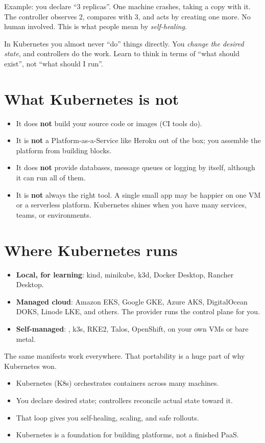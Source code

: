Example: you declare ``3 replicas''. One machine crashes, taking a copy with it.
The controller observes 2, compares with 3, and acts by creating one more. No
human involved. This is what people mean by \emph{self-healing}.

\begin{keyidea}
In Kubernetes you almost never ``do'' things directly. You \emph{change the
desired state}, and controllers do the work. Learn to think in terms of
``what should exist'', not ``what should I run''.
\end{keyidea}

\section{What Kubernetes is not}

\begin{itemize}
  \item It does \textbf{not} build your source code or images (CI tools do).
  \item It is \textbf{not} a Platform-as-a-Service like Heroku out of the box;
        you assemble the platform from building blocks.
  \item It does \textbf{not} provide databases, message queues or logging by
        itself, although it can run all of them.
  \item It is \textbf{not} always the right tool. A single small app may be
        happier on one VM or a serverless platform. Kubernetes shines when you
        have many services, teams, or environments.
\end{itemize}

\section{Where Kubernetes runs}

\begin{itemize}
  \item \textbf{Local, for learning}: kind, minikube, k3d, Docker Desktop, Rancher Desktop.
  \item \textbf{Managed cloud}: Amazon EKS, Google GKE, Azure AKS, DigitalOcean
        DOKS, Linode LKE, and others. The provider runs the control plane for you.
  \item \textbf{Self-managed}: , k3s, RKE2, Talos, OpenShift, on
        your own VMs or bare metal.
\end{itemize}

The same manifests work everywhere. That portability is a huge part of why
Kubernetes won.

\begin{recap}
\begin{itemize}
  \item Kubernetes (K8s) orchestrates containers across many machines.
  \item You declare desired state; controllers reconcile actual state toward it.
  \item That loop gives you self-healing, scaling, and safe rollouts.
  \item Kubernetes is a foundation for building platforms, not a finished PaaS.
\end{itemize}
\end{recap}
